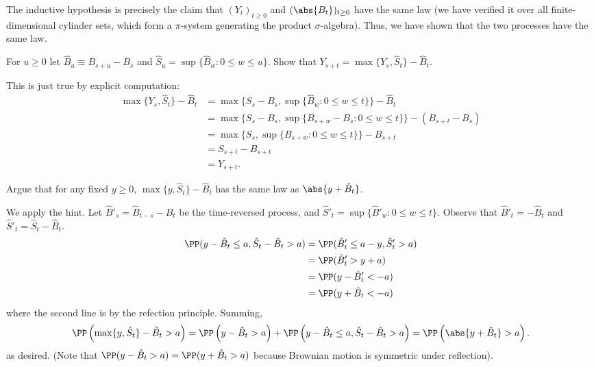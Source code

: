 \documentclass{scrartcl}
\begin{document}
The inductive hypothesis is precisely the claim that $(Y_t)_{t\geq 0}$ and $(\abs{B_t})_{t\geq 0}$ have the same law (we have verified it over all finite-dimensional cylinder sets, which form a $\pi$-system generating the product $\sigma$-algebra). Thus, we have shown that the two processes have the same law.

\begin{prob}
    For $u \geq 0$ let $\hat{B}_u \equiv B_{s+u} - B_s$ and $\hat{S}_u = \sup\{\hat{B}_w: 0 \leq w \leq u\}$. Show that $Y_{s+t} = \max\{Y_s, \hat{S}_t\} - \hat{B}_t$.
\end{prob}

This is just true by explicit computation:
\begin{align*}
    \max\{Y_s, \hat{S}_t\} - \hat{B}_t &= \max\{S_s - B_s, \sup\{\hat{B}_w: 0 \leq w \leq t\}\} - \hat{B}_t \\
    &= \max\{S_s - B_s, \sup\{ B_{s+w} - B_s: 0 \leq w \leq t\}\} - (B_{s+t} - B_s) \\
    &= \max\{S_s, \sup\{ B_{s+w}: 0 \leq w \leq t\}\} - B_{s+t} \\
    &= S_{s+t} - B_{s+t} \\
    &= Y_{s+t}.
\end{align*}
\begin{prob}
    Argue that for any fixed $y \geq 0$, $\max\{y, \hat{S}_t\} - \hat{B}_t$ has the same law as $\abs{y + \hat{B}_t}$.
\end{prob}
We apply the hint. Let $\hat{B}'_s = \hat{B}_{t-s} - \hat{B}_{t}$ be the time-reversed process, and $\hat{S}'_t = \sup\{\hat{B}'_w: 0 \leq w \leq t\}$. Observe that $\hat{B}'_t = -\hat{B}_t$ and $\hat{S}'_t = \hat{S}_t - \hat{B}_t$.
\begin{align*}
    \PP(y - \hat{B}_t \leq a, \hat{S}_t - \hat{B}_t > a) &= \PP(\hat{B}'_t \leq a - y, \hat{S}'_t> a)\\
    &= \PP(\hat{B}'_t > y + a)\\
    &= \PP(y-\hat{B}'_t < - a)\\
    &= \PP(y+\hat{B}_t < - a)
\end{align*}
where the second line is by the refection principle. Summing,
\[
    \PP\left(\max\{y, \hat{S}_t\} - \hat{B}_t > a\right) = \PP\left(y - \hat{B}_t > a\right) + \PP\left(y - \hat{B}_t \leq a, \hat{S}_t - \hat{B}_t > a\right) = \PP\left(\abs{y + \hat{B}_t} > a\right).    
\]
as desired. (Note that $\PP(y - \hat{B}_t > a) = \PP(y + \hat{B}_t > a)$ because Brownian motion is symmetric under reflection).
\end{document}
